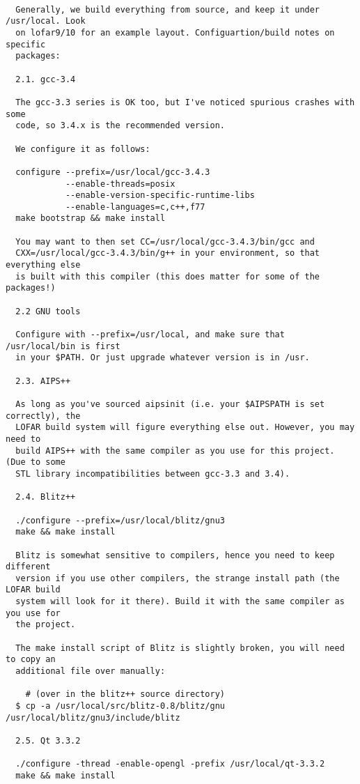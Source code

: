 \documentclass[10pt]{article}
\begin{document}
\begin{verbatim}

  Generally, we build everything from source, and keep it under /usr/local. Look
  on lofar9/10 for an example layout. Configuartion/build notes on specific
  packages:

  2.1. gcc-3.4

  The gcc-3.3 series is OK too, but I've noticed spurious crashes with some
  code, so 3.4.x is the recommended version.

  We configure it as follows:

  configure --prefix=/usr/local/gcc-3.4.3 
            --enable-threads=posix 
            --enable-version-specific-runtime-libs 
            --enable-languages=c,c++,f77
  make bootstrap && make install

  You may want to then set CC=/usr/local/gcc-3.4.3/bin/gcc and 
  CXX=/usr/local/gcc-3.4.3/bin/g++ in your environment, so that everything else
  is built with this compiler (this does matter for some of the packages!)

  2.2 GNU tools

  Configure with --prefix=/usr/local, and make sure that /usr/local/bin is first
  in your $PATH. Or just upgrade whatever version is in /usr.

  2.3. AIPS++ 

  As long as you've sourced aipsinit (i.e. your $AIPSPATH is set correctly), the
  LOFAR build system will figure everything else out. However, you may need to
  build AIPS++ with the same compiler as you use for this project. (Due to some
  STL library incompatibilities between gcc-3.3 and 3.4).

  2.4. Blitz++

  ./configure --prefix=/usr/local/blitz/gnu3
  make && make install

  Blitz is somewhat sensitive to compilers, hence you need to keep different
  version if you use other compilers, the strange install path (the LOFAR build
  system will look for it there). Build it with the same compiler as you use for 
  the project.
  
  The make install script of Blitz is slightly broken, you will need to copy an
  additional file over manually:
  
    # (over in the blitz++ source directory)
  $ cp -a /usr/local/src/blitz-0.8/blitz/gnu /usr/local/blitz/gnu3/include/blitz

  2.5. Qt 3.3.2

  ./configure -thread -enable-opengl -prefix /usr/local/qt-3.3.2
  make && make install


\end{verbatim}
\end{document}
